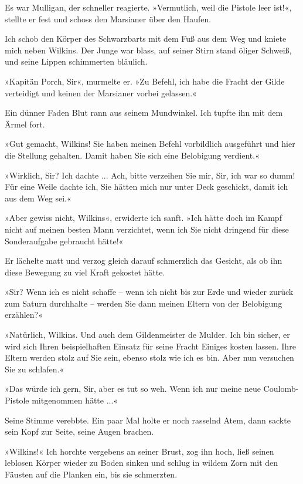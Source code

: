 Es war Mulligan, der schneller reagierte. »Vermutlich, weil die
Pistole leer ist!«, stellte er fest und schoss den Marsianer über
den Haufen.

\bigpar

Ich schob den Körper des Schwarzbarts mit dem Fuß aus dem Weg und
kniete mich neben Wilkins. Der Junge war blass, auf seiner Stirn
stand öliger Schweiß, und seine Lippen schimmerten bläulich.

»Kapitän Porch, Sir«, murmelte er. »Zu Befehl, ich habe die Fracht
der Gilde verteidigt und keinen der Marsianer vorbei gelassen.«

Ein dünner Faden Blut rann aus seinem Mundwinkel. Ich tupfte ihn
mit dem Ärmel fort.

»Gut gemacht, Wilkins! Sie haben meinen Befehl vorbildlich
ausgeführt und hier die Stellung gehalten. Damit haben Sie sich
eine Belobigung verdient.«

»Wirklich, Sir? Ich dachte ... Ach, bitte verzeihen Sie mir, Sir,
ich war so dumm! Für eine Weile dachte ich, Sie hätten mich nur
unter Deck geschickt, damit ich aus dem Weg sei.«

»Aber gewiss nicht, Wilkins«, erwiderte ich sanft. »Ich hätte doch
im Kampf nicht auf meinen besten Mann verzichtet, wenn ich Sie
nicht dringend für diese Sonderaufgabe gebraucht hätte!«

Er lächelte matt und verzog gleich darauf schmerzlich das Gesicht,
als ob ihn diese Bewegung zu viel Kraft gekostet hätte.

»Sir? Wenn ich es nicht schaffe – wenn ich nicht bis zur Erde und
wieder zurück zum Saturn durchhalte – werden Sie dann meinen Eltern
von der Belobigung erzählen?«

»Natürlich, Wilkins. Und auch dem Gildenmeister de Mulder. Ich bin
sicher, er wird sich Ihren beispielhaften Einsatz für seine Fracht
Einiges kosten lassen. Ihre Eltern werden stolz auf Sie sein,
ebenso stolz wie ich es bin. Aber nun versuchen Sie zu schlafen.«

»Das würde ich gern, Sir, aber es tut so weh. Wenn ich nur meine
neue Coulomb-Pistole mitgenommen hätte ...«

Seine Stimme verebbte. Ein paar Mal holte er noch rasselnd Atem,
dann sackte sein Kopf zur Seite, seine Augen brachen.

»Wilkins!« Ich horchte vergebens an seiner Brust, zog ihn hoch,
ließ seinen leblosen Körper wieder zu Boden sinken und schlug in
wildem Zorn mit den Fäusten auf die Planken ein, bis sie
schmerzten.

